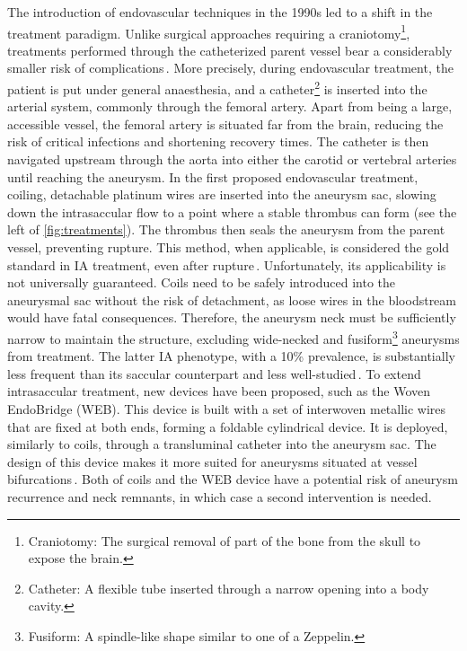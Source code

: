 The introduction of endovascular techniques in the 1990s led to a shift in the treatment paradigm. Unlike surgical approaches requiring a craniotomy\footnote{Craniotomy: The surgical removal of part of the bone from the skull to expose the brain.}, treatments performed through the catheterized parent vessel bear a considerably smaller risk of complications\,\cite{Molyneux2005}. More precisely, during endovascular treatment, the patient is put under general anaesthesia, and a catheter\footnote{Catheter: A flexible tube inserted through a narrow opening into a body cavity.} is inserted into the arterial system, commonly through the femoral artery. Apart from being a large, accessible vessel, the femoral artery is situated far from the brain, reducing the risk of critical infections and shortening recovery times. The catheter is then navigated upstream through the aorta into either the carotid or vertebral arteries until reaching the aneurysm. In the first proposed endovascular treatment, coiling, detachable platinum wires are inserted into the aneurysm sac, slowing down the intrasaccular flow to a point where a stable thrombus can form (see the left of \autoref{fig:treatments}). The thrombus then seals the aneurysm from the parent vessel, preventing rupture. This method, when applicable, is considered the gold standard in IA treatment, even after rupture\,\cite{Pineda2024}. Unfortunately, its applicability is not universally guaranteed. Coils need to be safely introduced into the aneurysmal sac without the risk of detachment, as loose wires in the bloodstream would have fatal consequences. Therefore, the aneurysm neck must be sufficiently narrow to maintain the structure, excluding wide-necked and fusiform\footnote{Fusiform: A spindle-like shape similar to one of a Zeppelin.} aneurysms from treatment. The latter IA phenotype, with a 10\% prevalence, is substantially less frequent than its saccular counterpart and less well-studied\,\cite{Keedy2006}. To extend intrasaccular treatment, new devices have been proposed, such as the Woven EndoBridge (WEB). This device is built with a set of interwoven metallic wires that are fixed at both ends, forming a foldable cylindrical device. It is deployed, similarly to coils, through a transluminal catheter into the aneurysm sac. The design of this device makes it more suited for aneurysms situated at vessel bifurcations\,\cite{KABBASCH2019}. Both of coils and the WEB device have a potential risk of aneurysm recurrence and neck remnants, in which case a second intervention is needed.

